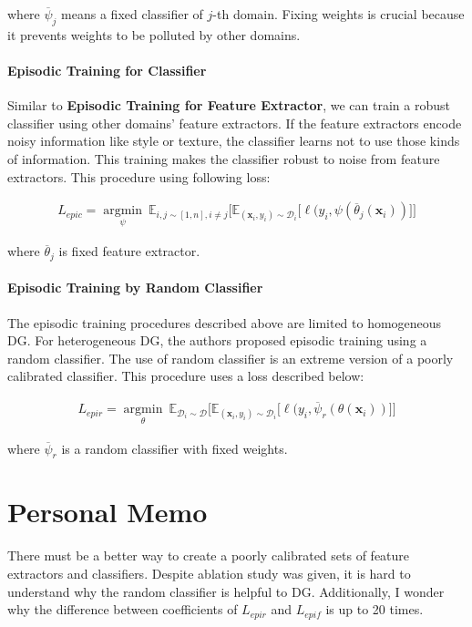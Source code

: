\documentclass[10pt,twocolumn,letterpaper]{article}
\begin{document}
where $\overline{\psi}_j$ means a fixed classifier of $j$-th domain. Fixing weights is crucial because it prevents weights to be polluted by other domains.

\paragraph{Episodic Training for Classifier}
Similar to \textbf{Episodic Training for Feature Extractor}, we can train a robust classifier using other domains' feature extractors. If the feature extractors encode noisy information like style or texture, the classifier learns not to use those kinds of information. This training makes the classifier robust to noise from feature extractors. This procedure using following loss:

\begin{equation}
\begin{aligned}
\label{eq:agg-reg-clf}
L_{epic} = \underset{\psi}{\operatorname{argmin}}~
\mathbb{E}_{i,j\sim[1,n], i\neq j} \big[ \mathbb{E}_{(\mathbf{x}_i,y_i)\sim \mathcal{D}_i} \big[  \ell(y_i, \psi(\overline{\theta}_j(\mathbf{x}_i)) \big] \big]
\end{aligned}
\end{equation}

where $\overline{\theta}_j$ is fixed feature extractor.

\paragraph{Episodic Training by Random Classifier}
The episodic training procedures described above are limited to homogeneous DG. For heterogeneous DG, the authors proposed episodic training using a random classifier. The use of random classifier is an extreme version of a poorly calibrated classifier. This procedure uses a loss described below:

\begin{equation}
\begin{aligned}
\label{eq:agg-fclf}
L_{epir} = \underset{\theta}{\operatorname{argmin}}~
\mathbb{E}_{\mathcal{D}_i\sim\mathcal{D}} \big[ \mathbb{E}_{(\mathbf{x}_i,y_i)\sim \mathcal{D}_i} \big[  \ell(y_i, \overline{\psi}_r(\theta(\mathbf{x}_i)) \big] \big]
\end{aligned}
\end{equation} 

where $\overline{\psi}_r$ is a random classifier with fixed weights.

\section{Personal Memo}
There must be a better way to create a poorly calibrated sets of feature extractors and classifiers. Despite ablation study was given, it is hard to understand why the random classifier is helpful to DG. Additionally, I wonder why the difference between coefficients of $L_{epir}$ and $L_{epif}$ is up to 20 times.
 



{\small

%
}
\end{document}
